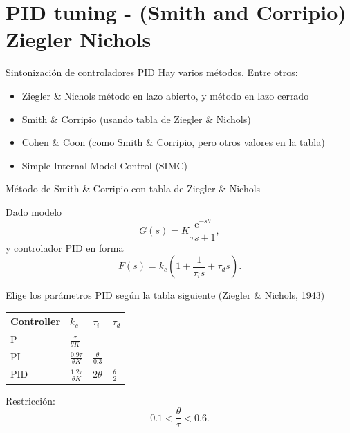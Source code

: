 \documentclass[presentation,aspectratio=169, usenames, dvipsnames]{beamer}
\begin{document}
\section{PID tuning - (Smith and Corripio) Ziegler Nichols}
\label{sec:org46a0b4d}
\begin{frame}[label={sec:orge7e6974}]{Sintonización de controladores PID}
\alert{Hay varios métodos.} Entre otros:

\begin{itemize}
\item Ziegler \& Nichols método en lazo abierto,  y método en lazo cerrado
\item Smith \& Corripio (usando tabla de Ziegler \& Nichols)
\item Cohen \& Coon (como Smith \& Corripio, pero otros valores en la tabla)
\item Simple Internal Model Control (SIMC)
\end{itemize}
\end{frame}

\begin{frame}[label={sec:org519739a}]{Método de Smith \& Corripio con tabla de Ziegler \& Nichols}
\small

Dado modelo \[ G(s) = K \frac{\mathrm{e}^{-s\theta}}{\tau s + 1}, \] y controlador PID en forma
   \[ F(s) = k_c\left( 1 + \frac{1}{\tau_i s} + \tau_d s\right). \]

Elige los parámetros PID según la tabla siguiente (Ziegler \& Nichols, 1943)
   \begin{center}
   \setlength{\tabcolsep}{20pt}
   \renewcommand{\arraystretch}{1.5}
   \begin{tabular}{llll}
   Controller & \(k_c\) & \(\tau_i\) & \(\tau_d\)\\
  \hline\hline
  P & \(\frac{\tau}{\theta K}\) &  & \\
  PI & \(\frac{0.9\tau}{\theta K}\) & \(\frac{\theta}{0.3}\) & \\
  PID & \(\frac{1.2\tau}{\theta K}\) & \(2\theta\) & \(\frac{\theta}{2}\)\\
  \hline
\end{tabular}
\end{center}

Restricción: \[0.1 < \frac{\theta}{\tau} < 0.6.\]
\end{frame}
\end{document}
